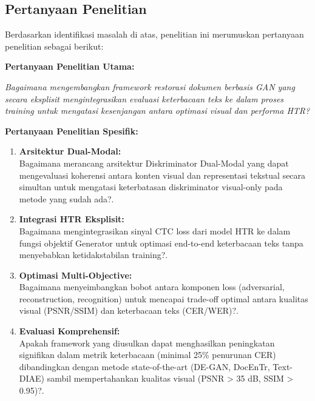 \documentclass[12pt,a4paper]{article}
\begin{document}
\vspace{0pt}
\subsection{Pertanyaan Penelitian}
\label{subsec:pertanyaan-penelitian}

Berdasarkan identifikasi masalah di atas, penelitian ini merumuskan pertanyaan penelitian sebagai berikut:

\vspace{0.5em}
\textbf{Pertanyaan Penelitian Utama:}

\textit{Bagaimana mengembangkan framework restorasi dokumen berbasis GAN yang secara eksplisit mengintegrasikan evaluasi keterbacaan teks ke dalam proses training untuk mengatasi kesenjangan antara optimasi visual dan performa HTR?}

\vspace{0.8em}
\textbf{Pertanyaan Penelitian Spesifik:}

\begin{enumerate}[label=\arabic*., leftmargin=0.5cm]
    \item \textbf{Arsitektur Dual-Modal:} \\
    Bagaimana merancang arsitektur Diskriminator Dual-Modal yang dapat mengevaluasi koherensi antara konten visual dan representasi tekstual secara simultan untuk mengatasi keterbatasan diskriminator visual-only pada metode yang sudah ada?.

    \item \textbf{Integrasi HTR Eksplisit:} \\
    Bagaimana mengintegrasikan sinyal CTC loss dari model HTR ke dalam fungsi objektif Generator untuk optimasi end-to-end keterbacaan teks tanpa menyebabkan ketidakstabilan training?.

    \item \textbf{Optimasi Multi-Objective:} \\
    Bagaimana menyeimbangkan bobot antara komponen loss (adversarial, reconstruction, recognition) untuk mencapai trade-off optimal antara kualitas visual (PSNR/SSIM) dan keterbacaan teks (CER/WER)?.

    \item \textbf{Evaluasi Komprehensif:} \\
    Apakah framework yang diusulkan dapat menghasilkan peningkatan signifikan dalam metrik keterbacaan (minimal 25\% penurunan CER) dibandingkan dengan metode state-of-the-art (DE-GAN, DocEnTr, Text-DIAE) sambil mempertahankan kualitas visual (PSNR > 35 dB, SSIM > 0.95)?.
\end{enumerate}
\vspace{0.8em}
\end{document}
